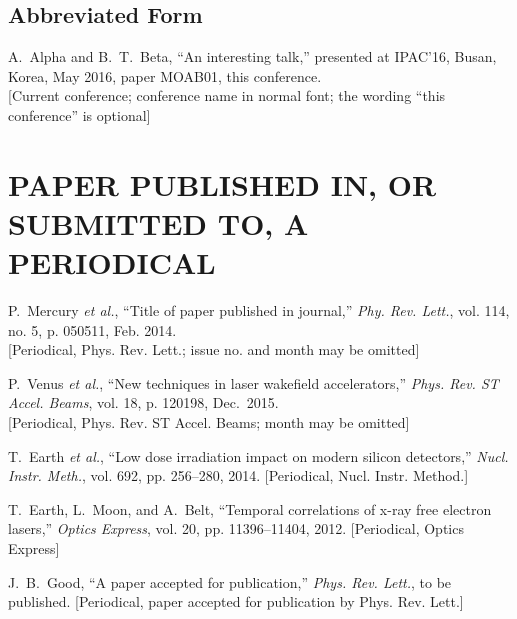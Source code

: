 \documentclass[letterpaper,  %
              ]{jacow-2_3}   %
\begin{document}
{{\subsection{Abbreviated Form}

\begin{thebibliography}{9} %
\setcounter{enumi}{4}
	A.~Alpha and B.~T.~Beta, 
	“An interesting talk,”
	presented at IPAC’16, 
	Busan, Korea, May 2016, 
	paper MOAB01, this conference.\\
	\textcolor{jgrepc}{[Current conference; conference name in normal font; the
		wording “this conference” is optional]}
\end{thebibliography}


\section{PAPER PUBLISHED IN, OR SUBMITTED TO, A PERIODICAL}

\begin{thebibliography}{99} %
  \setcounter{enumi}{5}
		P.~Mercury \emph{et al.}, 
		“Title of paper published in journal,”
		\emph{Phy. Rev. Lett.}, vol. 114, no. 5, 
		p. 050511, Feb. 2014. \\
	\textcolor{jblue}{[Periodical, Phys. Rev. Lett.; 
		             issue no. and month may be omitted]}

		P.~Venus \emph{et al.}, 
		“New techniques in laser wakefield accelerators,”
		\emph{Phys. Rev. ST Accel. Beams}, vol. 18, 
		p. 120198, Dec.~2015.   \\
	\textcolor{jblue}{[Periodical, Phys. Rev. ST Accel. Beams; 
			              month may be omitted]}

		T.~Earth \emph{et al.}, 
		“Low dose irradiation impact on modern silicon detectors,”
		\emph{Nucl. Instr. Meth.}, vol. 692, pp. 256--280, 2014.
	\textcolor{jblue}{[Periodical, Nucl. Instr. Method.]}
	
		T.~Earth, L.~Moon, and A.~Belt, 
		“Temporal correlations of x-ray free electron lasers,”
		\emph{Optics Express}, vol. 20, pp. 11396--11404, 2012.
	\textcolor{jblue}{[Periodical, Optics Express]}

		J.~B.~Good, 
		“A paper accepted for publication,”
		\emph{Phys. Rev. Lett.}, to be published.
	\textcolor{jblue}{[Periodical, paper accepted for publication 
		              by Phys. Rev. Lett.]}


\end{thebibliography}}}
\end{document}
